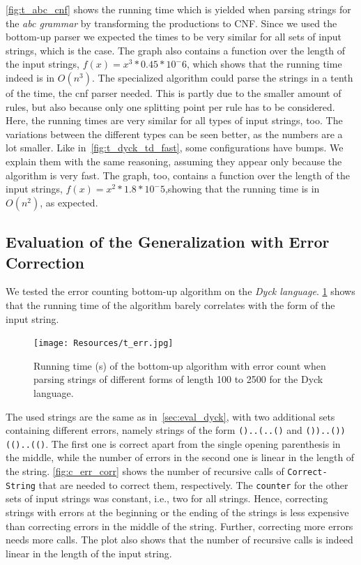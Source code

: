 \cref{fig:t_abc_cnf} shows the running time which is yielded when parsing strings for the \textit{abc grammar} by transforming the productions to CNF.
Since we used the bottom-up parser we expected the times to be very similar for all sets of input strings, which is the case.
The graph also contains a function over the length of the input strings, $f(x)=x^3*0.45*10^-6$, which shows that the running time indeed is in $O(n^3)$.
The specialized algorithm could parse the strings in a tenth of the time, the cnf parser needed.
This is partly due to the smaller amount of rules, but also because only one splitting point per rule has to be considered.
Here, the running times are very similar for all types of input strings, too.
The variations between the different types can be seen better, as the numbers are a lot smaller.
Like in~\cref{fig:t_dyck_td_fast}, some configurations have bumps.
We explain them with the same reasoning, assuming they appear only because the algorithm is very fast.
The graph, too, contains a function over the length of the input strings, $f(x)=x^2*1.8*10^-5$,showing that the running time is in $O(n^2)$, as expected.

\subsection{Evaluation of the Generalization with Error Correction}
We tested the error counting bottom-up algorithm on the \textit{Dyck language}.
\cref{fig:t_err} shows that the running time of the algorithm barely correlates with the form of the input string.


\begin{figure}[!ht]
    \centering
    \texttt{[image: Resources/t\_err.jpg]}
    \caption{Running time (s) of the bottom-up algorithm with error count when parsing strings of different forms of length 100 to 2500 for the Dyck language.}
    \label{fig:t_err}
\end{figure}

The used strings are the same as in~\cref{sec:eval_dyck}, with two additional sets containing different errors, namely strings of the form \texttt{()..(..()} and \texttt{())..())(()..(()}.
The first one is correct apart from the single opening parenthesis in the middle, while the number of errors in the second one is linear in the length of the string.
\cref{fig:c_err_corr} shows the number of recursive calls of \texttt{Correct-String} that are needed to correct them, respectively.
The \texttt{counter} for the other sets of input strings was constant, i.e., two for all strings.
Hence, correcting strings with errors at the beginning or the ending of the strings is less expensive than correcting errors in the middle of the string.
Further, correcting more errors needs more calls.
The plot also shows that the number of recursive calls is indeed linear in the length of the input string.

